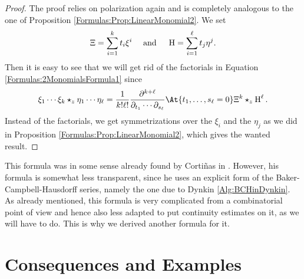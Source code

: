 \begin{proof}
	The proof relies on polarization again and is completely analogous 
	to the one of Proposition \ref{Formulas:Prop:LinearMonomial2}. We set
	\begin{equation*}
		\Xi
		=
		\sum\limits_{i=1}^k t_i \xi^i
		\quad \text{ and } \quad
		\operatorname{H}
		=
		\sum\limits_{i=1}^{\ell} t_j \eta^j
		.
	\end{equation*}
	Then it is easy to see that we will get rid of the factorials in Equation 
	\eqref{Formulas:2MonomialsFormula1} since
	\begin{equation*}
		\xi_1 \cdots \xi_k \star_z \eta_1 \cdots \eta_{\ell}
		=
		\frac{1}{k! \ell!}
		\frac{\partial^{k + \ell}}
		{\partial_{t_1} \cdots \partial_{s_{\ell}}}
		\At{t_1, \ldots, s_{\ell} = 0}
		\Xi^k \star_z \Eta^{\ell}.
	\end{equation*}
	Instead of the factorials, we get symmetrizations over the 
	$\xi_i$ and the $\eta_j$ as we did in Proposition 
	\ref{Formulas:Prop:LinearMonomial2}, which gives the wanted result.
\end{proof}
\begin{remark}
	This formula was in some sense already found by Corti{\~n}as in 
	\cite{cortinas:2002a}. However, his formula is somewhat less transparent, 
	since he uses an explicit form of the Baker-Campbell-Hausdorff series, 
	namely the one due to Dynkin \eqref{Alg:BCHinDynkin}. As already 
	mentioned, this formula is very complicated from a combinatorial point of 
	view and hence also less adapted to put continuity estimates on it, as we 
	will have to do. This is why we derived another formula for it.
\end{remark}


\section{Consequences and Examples}
\label{sec:chap4_Consequences}

